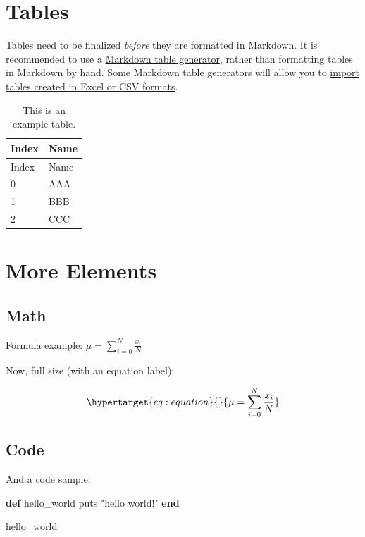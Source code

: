 \documentclass[
  11pt,
,
onecolumn,
openany
]{book}
\newenvironment{Shaded}{}{}
\newcommand{\ControlFlowTok}[1]{\textcolor[rgb]{0.00,0.44,0.13}{\textbf{#1}}}
\newcommand{\FunctionTok}[1]{\textcolor[rgb]{0.02,0.16,0.49}{#1}}
\newcommand{\NormalTok}[1]{#1}
\newcommand{\StringTok}[1]{\textcolor[rgb]{0.25,0.44,0.63}{#1}}
\begin{document}
\hypertarget{tables}{%
\section{Tables}\label{tables}}

Tables need to be finalized \emph{before} they are formatted in Markdown. It
is recommended to use a
\href{https://www.tablesgenerator.com/markdown_tables}{Markdown table
generator}, rather than formatting tables in Markdown by hand. Some Markdown
table generators will allow you to
\href{https://jakebathman.github.io/Markdown-Table-Generator/}{import tables
created in Excel or CSV formats}.

\begin{longtable}[]{@{}ll@{}}
\caption{This is an example table.}\tabularnewline
\toprule
Index & Name \\
\midrule
\endfirsthead
\toprule
Index & Name \\
\midrule
\endhead
0 & AAA \\
1 & BBB \\
2 & CCC \\
\bottomrule
\end{longtable}

\hypertarget{more-elements}{%
\section{More Elements}\label{more-elements}}

\hypertarget{math-1}{%
\subsection{Math}\label{math-1}}

Formula example: \(\mu = \sum_{i=0}^{N} \frac{x_i}{N}\)

Now, full size (with an equation label):

\begin{equation}\protect\hypertarget{eq:equation}{}{\mu = \sum_{i=0}^{N} \frac{x_i}{N}}\label{eq:equation}\end{equation}

\hypertarget{code}{%
\subsection{Code}\label{code}}

And a code sample:

\begin{Shaded}
\begin{Highlighting}[]
\ControlFlowTok{def}\NormalTok{ hello\_world}
  \FunctionTok{puts} \StringTok{"hello world!"}
\ControlFlowTok{end}

\NormalTok{hello\_world}
\end{Highlighting}
\end{Shaded}
\end{document}
